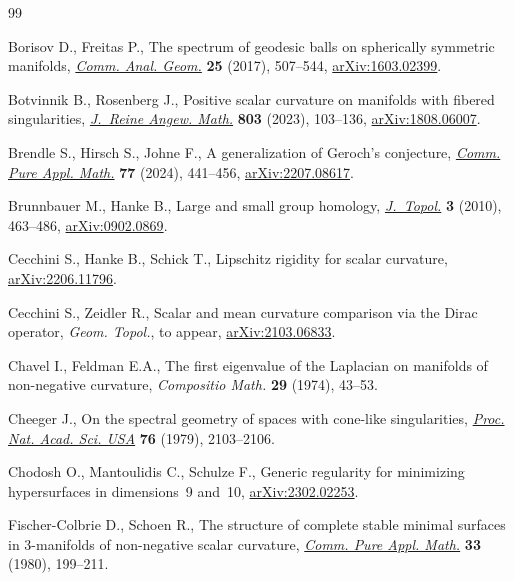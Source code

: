 \documentclass[10pt,a4paper]{amsart}
\numberwithin{equation}{section}
\begin{document}
\begin{thebibliography}{99}
\footnotesize\itemsep=0pt

Borisov D., Freitas P., The spectrum of geodesic balls on spherically symmetric
  manifolds, \href{https://doi.org/10.4310/CAG.2017.v25.n3.a1}{\textit{Comm. Anal. Geom.}} \textbf{25} (2017), 507--544,
  \href{https://arxiv.org/abs/1603.02399}{arXiv:1603.02399}.

Botvinnik B., Rosenberg J., Positive scalar curvature on manifolds with fibered
  singularities, \href{https://doi.org/10.1515/crelle-2023-0055}{\textit{J.~Reine Angew. Math.}} \textbf{803} (2023), 103--136,
  \href{https://arxiv.org/abs/1808.06007}{arXiv:1808.06007}.

Brendle S., Hirsch S., Johne F., A generalization of {G}eroch's conjecture,
  \href{https://doi.org/10.1002/cpa.22137}{\textit{Comm. Pure Appl. Math.}} \textbf{77} (2024), 441--456,
  \href{https://arxiv.org/abs/2207.08617}{arXiv:2207.08617}.

Brunnbauer M., Hanke B., Large and small group homology, \href{https://doi.org/10.1112/jtopol/jtq014}{\textit{J.~Topol.}}
  \textbf{3} (2010), 463--486, \href{https://arxiv.org/abs/0902.0869}{arXiv:0902.0869}.

Cecchini S., Hanke B., Schick T., Lipschitz rigidity for scalar curvature,
  \href{https://arxiv.org/abs/2206.11796}{arXiv:2206.11796}.

Cecchini S., Zeidler R., Scalar and mean curvature comparison via the {D}irac
  operator, \textit{Geom. Topol.}, {t}o appear, \href{https://arxiv.org/abs/2103.06833}{arXiv:2103.06833}.

Chavel I., Feldman E.A., The first eigenvalue of the {L}aplacian on manifolds
  of non-negative curvature, \textit{Compositio Math.} \textbf{29} (1974),
  43--53.

Cheeger J., On the spectral geometry of spaces with cone-like singularities,
  \href{https://doi.org/10.1073/pnas.76.5.2103}{\textit{Proc. Nat. Acad. Sci. USA}} \textbf{76} (1979), 2103--2106.

Chodosh O., Mantoulidis C., Schulze F., Generic regularity for minimizing
  hypersurfaces in dimensions~9 and~10, \href{https://arxiv.org/abs/2302.02253}{arXiv:2302.02253}.

Fischer-Colbrie D., Schoen R., The structure of complete stable minimal
  surfaces in {$3$}-manifolds of non-negative scalar curvature, \href{https://doi.org/10.1002/cpa.3160330206}{\textit{Comm.
  Pure Appl. Math.}} \textbf{33} (1980), 199--211.


\end{thebibliography}
\end{document}
